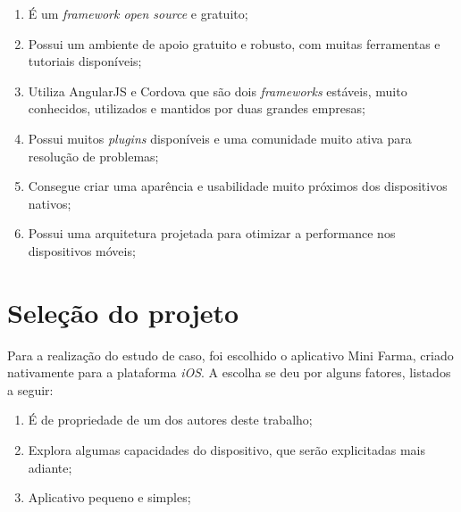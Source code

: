 \begin{enumerate}
    \item É um \textit{framework open source} e gratuito;
    \item Possui um ambiente de apoio gratuito e robusto, com muitas ferramentas e tutoriais disponíveis;
    \item Utiliza AngularJS e Cordova que são dois \textit{frameworks} estáveis, muito conhecidos, utilizados e mantidos por duas grandes empresas;
    \item Possui muitos \textit{plugins} disponíveis e uma comunidade muito ativa para resolução de problemas; %
    \item Consegue criar uma aparência e usabilidade muito próximos dos dispositivos nativos; %
    \item Possui uma arquitetura projetada para otimizar a performance nos dispositivos móveis; 
\end{enumerate}

\section{Seleção do projeto} \label{subsec:selecaodoprojeto}

Para a realização do estudo de caso, foi escolhido o aplicativo Mini Farma, criado nativamente para a plataforma \textit{iOS}. A escolha se deu por alguns fatores, listados a seguir:

\begin{enumerate}
    \item É de propriedade de um dos autores deste trabalho;
    \item Explora algumas capacidades do dispositivo, que serão explicitadas mais adiante;
    \item Aplicativo pequeno e simples;
\end{enumerate}
 
